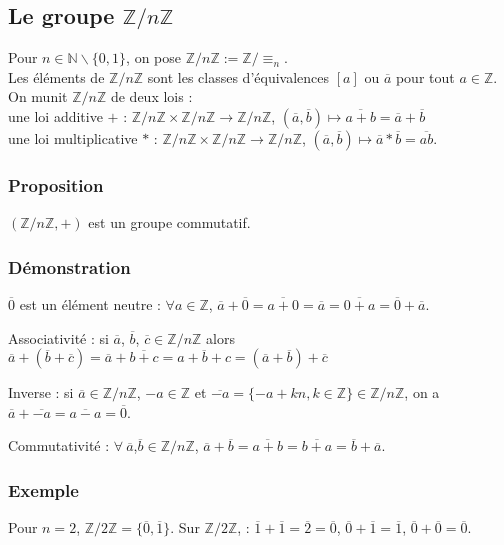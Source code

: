 \documentclass[a4paper,10pt]{book} %
\newcommand{\N}{\mathbb{N}}
\newcommand{\Z}{\mathbb{Z}}
\begin{document}
\newpage

\subsection{Le groupe $\Z/n\Z$}
Pour $n\in \N\backslash\{0,1\}$, on pose $\Z/n\Z:= \Z/\equiv_n$.\\
Les éléments de $\Z/n\Z$ sont les classes d'équivalences $[a]$ ou $\overline{a}$ pour tout $a\in \Z$.\\

On munit $\Z/n\Z$ de deux lois :\\
une loi additive $+$ : $\Z/n\Z \times \Z/n\Z\rightarrow \Z/n\Z$, $(\overline{a},\overline{b}) \mapsto \overline{a+b}=\overline{a}+\overline{b}$\\
une loi multiplicative $*$ : $\Z/n\Z\times \Z/n\Z \rightarrow \Z/n\Z$, $(\overline{a},\overline{b})\mapsto \overline{a}* \overline{b}=\overline{ab}$.

\subsubsection{Proposition}
$(\Z/n\Z,+)$ est un groupe commutatif.

\subsubsection{Démonstration}
$\overline{0}$ est un élément neutre : $\forall a\in \Z$, $\overline{a}+\overline{0}=\overline{a+0}=\overline{a}=\overline{0+a}=\overline{0}+\overline{a}$.

Associativité : 
si $\overline{a}$, $\overline{b}$, $\overline{c}\in \Z/n\Z$
alors $\overline{a}+(\overline{b}+\overline{c})=\overline{a}+\overline{b+c}=\overline{a+b+c}=(\overline{a}+\overline{b})+ \overline{c}$

Inverse : 
si $\overline{a} \in\Z/n\Z$, $-a\in \Z$ et $\overline{-a}=\{-a+kn,k\in\Z \}\in \Z/n\Z$, on a  $\overline{a}+\overline{-a}=\overline{a-a}=\overline{0}$.

Commutativité : $\forall~\overline{a}$,$\overline{b}\in \Z/n\Z$,
$\overline{a}+\overline{b}=\overline{a+b}=\overline{b+a}=\overline{b}+\overline{a}$.

\subsubsection{Exemple}
Pour $n=2$, $\Z/2\Z=\{\overline{0},\overline{1}\}$. Sur $\Z/2\Z$, : $\overline{1}+\overline{1}=\overline{2}=\overline{0}$, $\overline{0}+\overline{1}=\overline{1}$, $\overline{0}+\overline{0}=\overline{0}$.
\end{document}
